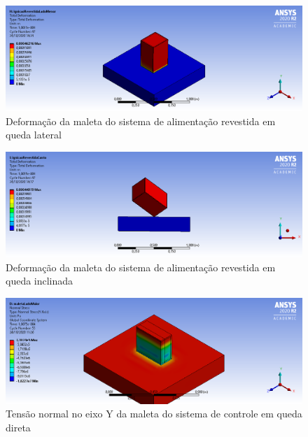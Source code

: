 \begin{apendicesenv}
\begin{figure}[htb]
    \centering
    \includegraphics[width=1.0\textwidth, angle=0]{figuras/estrutura_simulacaoImpacto/ignicaoRevestidaDeformacaoMenor.png}
    \caption{Deformação da maleta do sistema de alimentação revestida em queda lateral}
    \label{fig:simulacaoImpacto_17}
\end{figure}

\begin{figure}[htb]
    \centering
    \includegraphics[width=1.0\textwidth, angle=0]{figuras/estrutura_simulacaoImpacto/ignicaoRevestidaDeformacaoCanto.png}
    \caption{Deformação da maleta do sistema de alimentação revestida em queda inclinada}
    \label{fig:simulacaoImpacto_18}
\end{figure}

\begin{figure}[htb]
    \centering
    \includegraphics[width=1.0\textwidth, angle=0]{figuras/estrutura_simulacaoImpacto/maletaNormalYMaior.png}
    \caption{Tensão normal no eixo Y da maleta do sistema de controle em queda direta}
    \label{fig:simulacaoImpacto_19}
\end{figure}


\end{apendicesenv}

